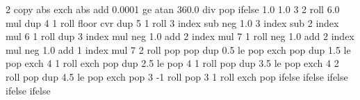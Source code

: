 {\pgfpoint{-50bp}{-50bp}}
{\pgfpoint{50bp}{50bp}}
{}
{ %
  2 copy abs exch abs add 0.0001 ge
  {atan 360.0 div} %
  { pop } %
  ifelse  %
  1.0 1.0 %
  3 2 roll 6.0 mul dup 4 1 roll %
  floor cvr  %
  dup 5 1 roll %
  3 index sub neg %
  1.0 3 index sub %
  2 index mul %
  6 1 roll %
  dup 3 index mul neg 1.0 add %
  2 index mul %
  7 1 roll %
  neg 1.0 add %
  2 index mul neg 1.0  add %
  1 index mul %
  7 2 roll %
  pop pop %
  dup 0.5 le %
  { %
    pop exch pop
  }
  { dup 1.5 le %
    { %
      pop exch 4 1 roll exch pop
    }
    { dup 2.5 le %
      { %
        pop 4 1 roll pop
      }
      { dup 3.5 le %
        { %
          pop exch 4 2 roll pop
        }
        { dup 4.5 le %
          { %
            pop exch pop 3 -1 roll
          }
          { %
            pop 3 1 roll exch pop
          }
          ifelse
        }
        ifelse %
      }
      ifelse %
    }
    ifelse %
  }
  ifelse %
}%


%
%

%
%
%
%

